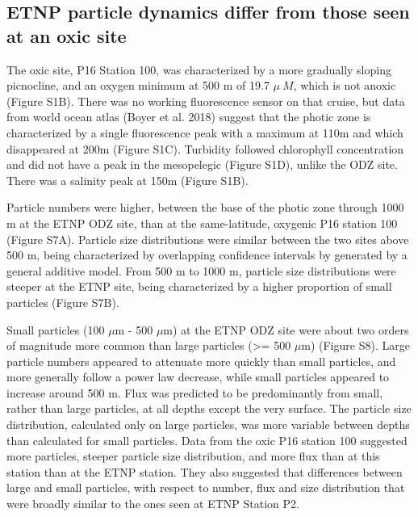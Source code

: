 \documentclass[]{article}
\begin{document}
\hypertarget{etnp-particle-dynamics-differ-from-those-seen-at-an-oxic-site}{%
\subsection{ETNP particle dynamics differ from those seen at an oxic
site}\label{etnp-particle-dynamics-differ-from-those-seen-at-an-oxic-site}}

The oxic site, P16 Station 100, was characterized by a more gradually
sloping picnocline, and an oxygen minimum at 500 m of 19.7 \(\mu~M\),
which is not anoxic (Figure S1B). There was no working fluorescence
sensor on that cruise, but data from world ocean atlas (Boyer et al.
2018) suggest that the photic zone is characterized by a single
fluorescence peak with a maximum at 110m and which disappeared at 200m
(Figure S1C). Turbidity followed chlorophyll concentration and did not
have a peak in the mesopelegic (Figure S1D), unlike the ODZ site. There
was a salinity peak at 150m (Figure S1B).

Particle numbers were higher, between the base of the photic zone
through 1000 m at the ETNP ODZ site, than at the same-latitude, oxygenic
P16 station 100 (Figure S7A). Particle size distributions were similar
between the two sites above 500 m, being characterized by overlapping
confidence intervals by generated by a general additive model. From 500
m to 1000 m, particle size distributions were steeper at the ETNP site,
being characterized by a higher proportion of small particles (Figure
S7B).

Small particles (100 \(\mu\)m - 500 \(\mu\)m) at the ETNP ODZ site were
about two orders of magnitude more common than large particles
(\textgreater{}= 500 \(\mu\)m) (Figure S8). Large particle numbers
appeared to attenuate more quickly than small particles, and more
generally follow a power law decrease, while small particles appeared to
increase around 500 m. Flux was predicted to be predominantly from
small, rather than large particles, at all depths except the very
surface. The particle size distribution, calculated only on large
particles, was more variable between depths than calculated for small
particles. Data from the oxic P16 station 100 suggested more particles,
steeper particle size distribution, and more flux than at this station
than at the ETNP station. They also suggested that differences between
large and small particles, with respect to number, flux and size
distribution that were broadly similar to the ones seen at ETNP Station
P2.
\end{document}
